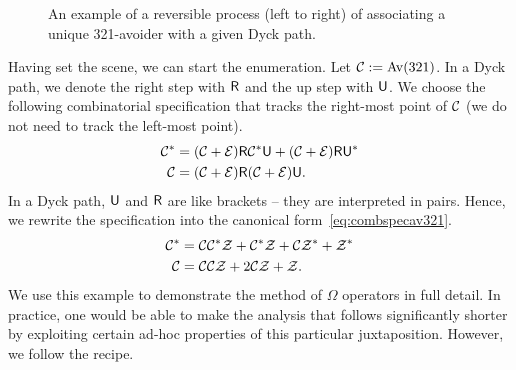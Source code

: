 \documentclass[12pt, a4paper, twoside]{report}
\begin{document}
\begin{figure}[!ht]
\begin{center}
\caption{\small{An example of a reversible process (left to right) of associating a unique 321-avoider with a given Dyck path.}}
\end{center}
\end{figure}

Having set the scene, we can start the enumeration. Let $\mathcal{C} := \mathrm{Av}(321)$. In a Dyck path, we denote the right step with $\mathsf{R}$ and the up step with $\mathsf{U}$. We choose the following combinatorial specification that tracks the right-most point of $\mathcal{C}$ (we do not need to track the left-most point). 
\begin{align*}
  \mathcal{C}^* &= (\mathcal{C} + \mathcal{E})\mathsf{R}\mathcal{C}^*\mathsf{U} + (\mathcal{C} + \mathcal{E})\mathsf{R}\mathsf{U}^*\\
  \mathcal{C} &= (\mathcal{C}+\mathcal{E})\mathsf{R} (\mathcal{C}+\mathcal{E})\mathsf{U}.
\end{align*}
In a Dyck path, $\mathsf{U}$ and $\mathsf{R}$ are like brackets -- they are interpreted in pairs. Hence, we rewrite the specification into the canonical form~\eqref{eq:combspecav321}. 
\begin{align}
  \begin{aligned}
  \mathcal{C}^* &= \mathcal{C}\mathcal{C}^*\mathcal{Z} + \mathcal{C}^*\mathcal{Z} + \mathcal{C}\mathcal{Z}^* + \mathcal{Z}^*\\
  \mathcal{C} &= \mathcal{C}\mathcal{C}\mathcal{Z} + 2\mathcal{C}\mathcal{Z} + \mathcal{Z}.
\end{aligned}
       \label{eq:combspecav321}
\end{align}
We use this example to demonstrate the method of $\Omega$ operators in full detail. In practice, one would be able to make the analysis that follows significantly shorter by exploiting certain ad-hoc properties of this particular juxtaposition. However, we follow the recipe.
\end{document}
